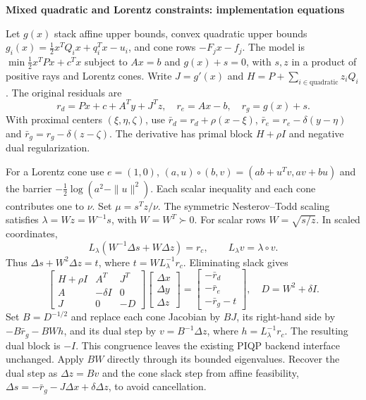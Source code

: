 \documentclass[10pt]{article}
\begin{document}
\noindent\textbf{Mixed quadratic and Lorentz constraints: implementation equations}\par\medskip
Let $g(x)$ stack affine upper bounds, convex quadratic upper bounds
$g_i(x)=\tfrac12x^TQ_ix+q_i^Tx-u_i$, and cone rows $-F_jx-f_j$.
The model is $\min\tfrac12x^TPx+c^Tx$ subject to $Ax=b$ and
$g(x)+s=0$, with $s,z$ in a product of positive rays and Lorentz cones.
Write $J=g'(x)$ and $H=P+\sum_{i\in\mathrm{quadratic}}z_iQ_i$.
The original residuals are
\[
r_d=Px+c+A^Ty+J^Tz,\quad r_e=Ax-b,\quad r_g=g(x)+s.
\]
With proximal centers $(\xi,\eta,\zeta)$, use
$\bar r_d=r_d+\rho(x-\xi)$,
$\bar r_e=r_e-\delta(y-\eta)$ and
$\bar r_g=r_g-\delta(z-\zeta)$.
The derivative has primal block $H+\rho I$ and negative dual regularization.

For a Lorentz cone use $e=(1,0)$,
$(a,u)\circ(b,v)=(ab+u^Tv,av+bu)$ and the barrier
$-\tfrac12\log(a^2-\|u\|^2)$.
Each scalar inequality and each cone contributes one to $\nu$.
Set $\mu=s^Tz/\nu$. The symmetric Nesterov--Todd scaling satisfies
$\lambda=Wz=W^{-1}s$, with $W=W^T\succ0$.
For scalar rows $W=\sqrt{s/z}$. In scaled coordinates,
\[
 L_\lambda(W^{-1}\Delta s+W\Delta z)=r_c,
 \qquad L_\lambda v=\lambda\circ v.
\]
Thus $\Delta s+W^2\Delta z=t$, where $t=W L_\lambda^{-1}r_c$.
Eliminating slack gives
\[
\begin{bmatrix}H+\rho I&A^T&J^T\\
 A&-\delta I&0\\J&0&-D\end{bmatrix}
\begin{bmatrix}\Delta x\\\Delta y\\\Delta z\end{bmatrix}
=\begin{bmatrix}-\bar r_d\\-\bar r_e\\-\bar r_g-t\end{bmatrix},
\quad D=W^2+\delta I.
\]
Set $B=D^{-1/2}$ and replace each cone Jacobian by $BJ$,
its right-hand side by $-B\bar r_g-BWh$, and its dual step by
$v=B^{-1}\Delta z$, where $h=L_\lambda^{-1}r_c$.
The resulting dual block is $-I$.
This congruence leaves the existing PIQP backend interface unchanged.
Apply $BW$ directly through its bounded eigenvalues. Recover the dual step
as $\Delta z=Bv$ and the cone slack step from affine feasibility,
$\Delta s=-\bar r_g-J\Delta x+\delta\Delta z$, to avoid cancellation.
\end{document}
